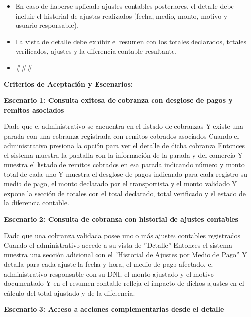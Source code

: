 \documentclass[a4paper,9pt]{article}
\begin{document}
\begin{tcolorbox}[hucard, title={\textbf{HU-50: VER DETALLE DE COBRANZA} \hfill \scriptsize \colorbox{bluestatus}{\textbf{\ New\ }} \quad \colorbox{white}{\textcolor{primarydark}{\textbf{\ 2 pts\ }}}}]
{\begin{itemize}[leftmargin=12pt, nosep, itemsep=1.5pt, topsep=1pt]
\item En caso de haberse aplicado ajustes contables posteriores, el detalle debe incluir el historial de ajustes realizados (fecha, medio, monto, motivo y usuario responsable).
\item La vista de detalle debe exhibir el resumen con los totales declarados, totales verificados, ajustes y la diferencia contable resultante.
\item \#\#\#
\end{itemize}
}\par\vspace{3pt}
\noindent\textbf{\footnotesize Criterios de Aceptación y Escenarios:}\par\vspace{2pt}
{\footnotesize
\noindent\textbf{\textcolor{secondarydark}{Escenario 1:  Consulta exitosa de cobranza con desglose de pagos y remitos asociados}}\par\vspace{1pt}
Dado que el administrativo se encuentra en el listado de cobranzas Y existe una parada con una cobranza registrada con remitos cobrados asociados Cuando el administrativo presiona la opción para ver el detalle de dicha cobranza Entonces el sistema muestra la pantalla con la información de la parada y del comercio Y muestra el listado de remitos cobrados en esa parada indicando número y monto total de cada uno Y muestra el desglose de pagos indicando para cada registro su medio de pago, el monto declarado por el transportista y el monto validado Y expone la sección de totales con el total declarado, total verificado y el estado de la diferencia contable.\par\vspace{2.5pt}
\noindent\textbf{\textcolor{secondarydark}{Escenario 2:  Consulta de cobranza con historial de ajustes contables}}\par\vspace{1pt}
Dado que una cobranza validada posee uno o más ajustes contables registrados Cuando el administrativo accede a su vista de ''Detalle'' Entonces el sistema muestra una sección adicional con el ''Historial de Ajustes por Medio de Pago'' Y detalla para cada ajuste la fecha y hora, el medio de pago afectado, el administrativo responsable con su DNI, el monto ajustado y el motivo documentado Y en el resumen contable refleja el impacto de dichos ajustes en el cálculo del total ajustado y de la diferencia.\par\vspace{2.5pt}
\noindent\textbf{\textcolor{secondarydark}{Escenario 3:  Acceso a acciones complementarias desde el detalle}}\par\vspace{1pt}
}
\end{tcolorbox}
\end{document}
